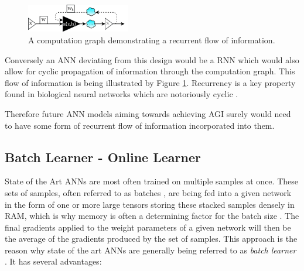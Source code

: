  
\begin{figure}
  \centering 
  \includegraphics[width=0.40\textwidth]{PICs/cyclic-graph.png}
  \caption{A computation graph demonstrating a recurrent flow of information.}
  \label{cyclic-graph}
\end{figure}

Conversely an ANN deviating from this design would be a \acf{RNN} which would also allow for cyclic propagation of information through the computation graph.
 \cite[p. 143]{Patterson-Gibson-2017} \cite[p. 10-13]{10_rec-NN-Review_2015}
This flow of information is being illustrated by Figure \ref{cyclic-graph}. Recurrency is a key property found in biological neural networks which are notoriously cyclic
\cite{28_recurrence-in-BNN-Kietzmann_2019} \cite{29_recurrence-in-BNN-Kohitij354753}.

Therefore future ANN models aiming towards achieving \acf{AGI} surely would need to have some form of recurrent flow of information incorporated into them.
 


 
\clearpage


\subsection{Batch Learner - Online Learner}\label{subsec_batch-learner}


State of the Art \acp{ANN} are most often trained on multiple samples at once. 
\cite[p.1]{30_online-deep-learning}
These sets of samples, often referred to as batches \cite[chapter 4]{LeCunBOM12}, are being fed into a given network in the form of one or more large tensors storing these stacked samples densely in RAM, which is why memory is often a determining factor for the batch size \cite[subsection 8.1.3]{Goodfellow-et-al-2016}.  
The final gradients applied
to the weight parameters of a given network
will then be the average of the gradients 
produced by the set of samples.
This approach is the reason why state of the art \acp{ANN} are generally being referred to as \textit{batch learner} \cite[p.1]{30_online-deep-learning}. \linebreak
It has several advantages:

